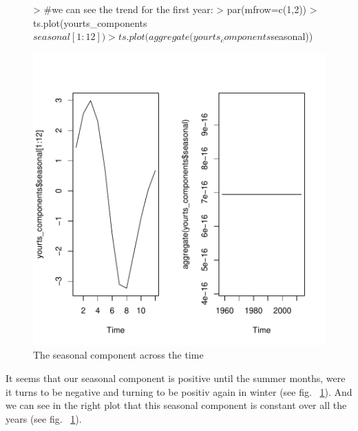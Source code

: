 \documentclass[11pt, a4paper]{article} %
\begin{document}
\begin{figure}[H]
\centering
\begin{Schunk}
\begin{Sinput}
> #we can see the trend for the first year:
> par(mfrow=c(1,2))
> ts.plot(yourts_components$seasonal[1:12])
> ts.plot(aggregate(yourts_components$seasonal))
\end{Sinput}
\end{Schunk}
\includegraphics{alles-decomposition}
\caption{The seasonal component across the time}
\label{decomposition}
\end{figure}
It seems that our seasonal component is positive until the summer months, were it turns to be negative and turning to be positiv again in winter (see fig. ~\ref{decomposition}). And we can see in the right plot that this seasonal component is constant over all the years (see fig. ~\ref{decomposition}).
\end{document}
